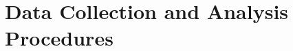 \begin{comment}
Finally, to explore the potential impact of system-level contention, a set of exploratory experiments introduced artificial background load during native execution. Although Keystone enclaves currently operate in a single-threaded, non-preemptive mode, testing under load offered preliminary insights into how enclave performance might be influenced in future multi-threaded or multi-tenant scenarios, especially in shared virtualized environments. While these tests were not a primary focus of the evaluation, they provided valuable context for interpreting variability in the results.
\end{comment}

\section{Data Collection and Analysis Procedures}